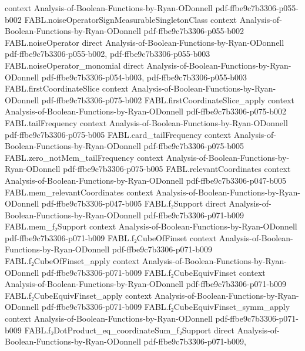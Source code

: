 \begin{theorem}
  {context}
  {Analysis-of-Boolean-Functions-by-Ryan-ODonnell}
  {pdf-ffbe9c7b3306-p055-b002}
\proofstep
  {FABL.noiseOperatorSignMeasurableSingletonClass}
  {context}
  {Analysis-of-Boolean-Functions-by-Ryan-ODonnell}
  {pdf-ffbe9c7b3306-p055-b002}
\proofstep
  {FABL.noiseOperator}
  {direct}
  {Analysis-of-Boolean-Functions-by-Ryan-ODonnell}
  {pdf-ffbe9c7b3306-p055-b002,
    pdf-ffbe9c7b3306-p055-b003}
\proofstep
  {FABL.noiseOperator_monomial}
  {direct}
  {Analysis-of-Boolean-Functions-by-Ryan-ODonnell}
  {pdf-ffbe9c7b3306-p054-b003,
    pdf-ffbe9c7b3306-p055-b003}
\proofstep
  {FABL.firstCoordinateSlice}
  {context}
  {Analysis-of-Boolean-Functions-by-Ryan-ODonnell}
  {pdf-ffbe9c7b3306-p075-b002}
\proofstep
  {FABL.firstCoordinateSlice_apply}
  {context}
  {Analysis-of-Boolean-Functions-by-Ryan-ODonnell}
  {pdf-ffbe9c7b3306-p075-b002}
\proofstep
  {FABL.tailFrequency}
  {context}
  {Analysis-of-Boolean-Functions-by-Ryan-ODonnell}
  {pdf-ffbe9c7b3306-p075-b005}
\proofstep
  {FABL.card_tailFrequency}
  {context}
  {Analysis-of-Boolean-Functions-by-Ryan-ODonnell}
  {pdf-ffbe9c7b3306-p075-b005}
\proofstep
  {FABL.zero_notMem_tailFrequency}
  {context}
  {Analysis-of-Boolean-Functions-by-Ryan-ODonnell}
  {pdf-ffbe9c7b3306-p075-b005}
\proofstep
  {FABL.relevantCoordinates}
  {context}
  {Analysis-of-Boolean-Functions-by-Ryan-ODonnell}
  {pdf-ffbe9c7b3306-p047-b005}
\proofstep
  {FABL.mem_relevantCoordinates}
  {context}
  {Analysis-of-Boolean-Functions-by-Ryan-ODonnell}
  {pdf-ffbe9c7b3306-p047-b005}
\proofstep
  {FABL.f₂Support}
  {direct}
  {Analysis-of-Boolean-Functions-by-Ryan-ODonnell}
  {pdf-ffbe9c7b3306-p071-b009}
\proofstep
  {FABL.mem_f₂Support}
  {context}
  {Analysis-of-Boolean-Functions-by-Ryan-ODonnell}
  {pdf-ffbe9c7b3306-p071-b009}
\proofstep
  {FABL.f₂CubeOfFinset}
  {context}
  {Analysis-of-Boolean-Functions-by-Ryan-ODonnell}
  {pdf-ffbe9c7b3306-p071-b009}
\proofstep
  {FABL.f₂CubeOfFinset_apply}
  {context}
  {Analysis-of-Boolean-Functions-by-Ryan-ODonnell}
  {pdf-ffbe9c7b3306-p071-b009}
\proofstep
  {FABL.f₂CubeEquivFinset}
  {context}
  {Analysis-of-Boolean-Functions-by-Ryan-ODonnell}
  {pdf-ffbe9c7b3306-p071-b009}
\proofstep
  {FABL.f₂CubeEquivFinset_apply}
  {context}
  {Analysis-of-Boolean-Functions-by-Ryan-ODonnell}
  {pdf-ffbe9c7b3306-p071-b009}
\proofstep
  {FABL.f₂CubeEquivFinset_symm_apply}
  {context}
  {Analysis-of-Boolean-Functions-by-Ryan-ODonnell}
  {pdf-ffbe9c7b3306-p071-b009}
\proofstep
  {FABL.f₂DotProduct_eq_coordinateSum_f₂Support}
  {direct}
  {Analysis-of-Boolean-Functions-by-Ryan-ODonnell}
  {pdf-ffbe9c7b3306-p071-b009,
}
\end{theorem}
